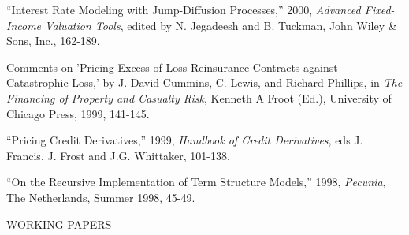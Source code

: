 \documentclass{article}
\begin{document}
\begin{etaremune}
\item
``Interest Rate Modeling with Jump-Diffusion Processes,'' 2000,
{\it Advanced Fixed-Income Valuation Tools}, edited by
N. Jegadeesh and B. Tuckman, John Wiley \& Sons, Inc., 162-189.

\item
Comments on 'Pricing Excess-of-Loss Reinsurance Contracts against
Catastrophic Loss,' by J. David Cummins, C. Lewis, and Richard Phillips,
in {\it The Financing of Property and Casualty Risk}, Kenneth A
Froot (Ed.), University of Chicago Press, 1999, 141-145. 

\item ``Pricing Credit Derivatives,'' 1999, {\it Handbook of Credit
Derivatives}, eds J. Francis, J. Frost and J.G. Whittaker, 101-138.



\item
``On the Recursive Implementation of Term Structure Models,'' 
1998, {\it Pecunia}, The Netherlands, Summer 1998, 45-49.


\end{etaremune}





\begin{description}
\item[WORKING PAPERS] \mbox{}
\end{description}
\end{document}
